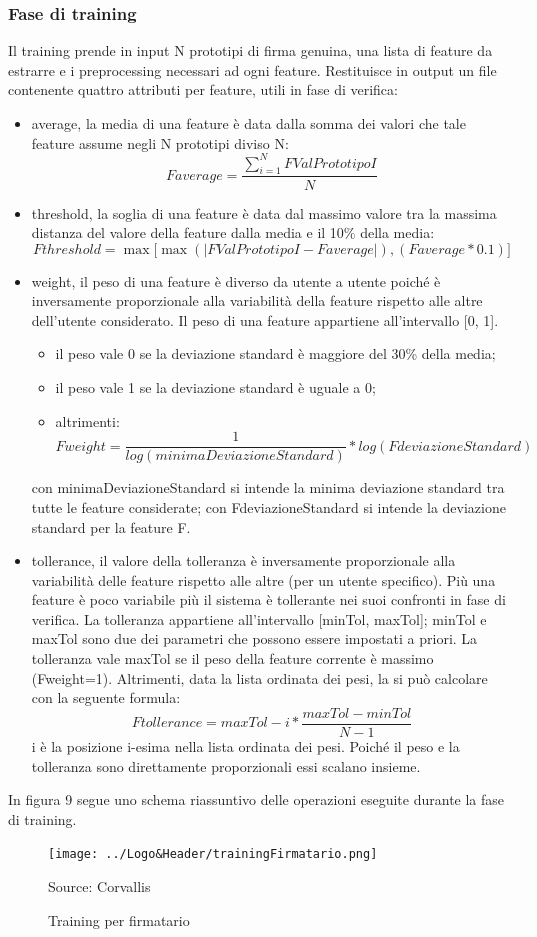 \subsubsection*{Fase di training}
\label{2.1.4.1}
Il training prende in input N prototipi di firma genuina, una lista di feature da estrarre e i preprocessing necessari ad ogni feature. Restituisce in output un file contenente quattro attributi per feature, utili in fase di verifica:
\begin{itemize}
\item average, la media di una feature è data dalla somma dei valori che tale feature assume negli N prototipi diviso N:
\[Faverage =
\frac{\sum\limits_{i=1}^N FValPrototipoI}{N}
\]
\item threshold, la soglia di una feature è data dal massimo valore tra la massima distanza del valore della feature dalla media e il 10\% della media:
\[Fthreshold = 
\max \lbrack \max ( |FValPrototipoI - Faverage| ) , ( Faverage * 0.1 )\rbrack
\]
\item weight, il peso di una feature è diverso da utente a utente poiché è inversamente proporzionale alla variabilità della feature rispetto alle altre dell'utente considerato. Il peso di una feature appartiene all'intervallo [0, 1].
\begin{itemize}
\item il peso vale 0 se la deviazione standard è maggiore del 30\% della media;
\item il peso vale 1 se la deviazione standard è uguale a 0;
\item altrimenti:
\[Fweight = \frac{1}{log(minimaDeviazioneStandard)} * log(FdeviazioneStandard)\]
\end{itemize}
con minimaDeviazioneStandard si intende la minima deviazione standard tra tutte le feature considerate; con FdeviazioneStandard si intende la deviazione standard per la feature F.
\item tollerance, il valore della tolleranza è inversamente proporzionale alla variabilità delle feature rispetto alle altre (per un utente specifico). Più una feature è poco variabile più il sistema è tollerante nei suoi confronti in fase di verifica. La tolleranza appartiene all'intervallo [minTol, maxTol]; minTol e maxTol sono due dei parametri che possono essere impostati a priori. La tolleranza vale maxTol se il peso della feature corrente è massimo (Fweight=1). Altrimenti, data la lista ordinata dei pesi, la si può calcolare con la seguente formula:
\[Ftollerance=maxTol - i * \frac{maxTol - minTol}{N-1}\]
i è la posizione i-esima nella lista ordinata dei pesi. Poiché il peso e la tolleranza sono direttamente proporzionali essi scalano insieme.
\end{itemize}
In figura 9 segue uno schema riassuntivo delle operazioni eseguite durante la fase di training.
\begin{figure}[H]
\centering
\texttt{[image: ../Logo\&Header/trainingFirmatario.png]}
\caption{Training per firmatario}Source: Corvallis
\end{figure}

